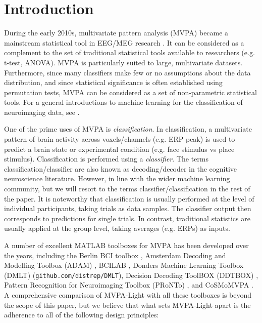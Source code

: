 \documentclass[utf8]{frontiersSCNS} %
\begin{document}
\section{Introduction}

During the early 2010s, multivariate pattern analysis (MVPA) became a mainstream statistical tool in EEG/MEG research \citep{Lemm2011,Grootswagers2017DecodingData}. It can be considered as a complement to the set of traditional statistical tools available to researchers (e.g. t-test, ANOVA). MVPA is particularly suited to large, multivariate datasets. Furthermore, since many classifiers make few or no assumptions about the data distribution, and since  statistical significance is often established using permutation tests, MVPA can be considered as a set of non-parametric statistical tools. For a general introductions to machine learning for the classification of neuroimaging data, see \cite{Blankertz2011,Lemm2011,Mur2009,Grootswagers2017DecodingData,King2014}.

One of the prime uses of MVPA is \textit{classification}. In classification, a multivariate pattern of brain activity across voxels/channels (e.g. ERP peak) is used to predict a brain state or experimental condition (e.g. face stimulus vs place stimulus). Classification is performed using a \textit{classifier}. The terms classification/classifier are also known as decoding/decoder in the cognitive neuroscience literature. However, in line with the wider machine learning community, but we will resort to the terms classifier/classification in the rest of the paper. It is noteworthy that classification is usually performed at the level of individual participants, taking trials as data samples. The classifier output then corresponds to predictions for single trials. In contrast, traditional statistics are usually applied at the group level, taking averages (e.g. ERPs) as inputs.

A number of excellent MATLAB toolboxes for MVPA has been developed over the years, including the Berlin BCI toolbox \citep{Blankertz2016TheControl}, Amsterdam Decoding and Modelling Toolbox (ADAM) \citep{Fahrenfort2018FromADAM}, BCILAB \citep{Kothe2013BCILAB:Development}, Donders Machine Learning Toolbox (DMLT) (\texttt{github.com/distrep/DMLT}), Decision Decoding ToolBOX (DDTBOX) \citep{Bode2019ThePotentials}, Pattern Recognition for Neuroimaging Toolbox (PRoNTo) \citep{Schrouff2013PRoNTo:Toolbox}, and CoSMoMVPA \citep{Oosterhof2016CoSMoMVPA:Octave}. A comprehensive comparison of MVPA-Light with all these toolboxes is beyond the scope of this paper, but we believe that what sets MVPA-Light apart is the adherence to all of the following design principles: 
\end{document}
